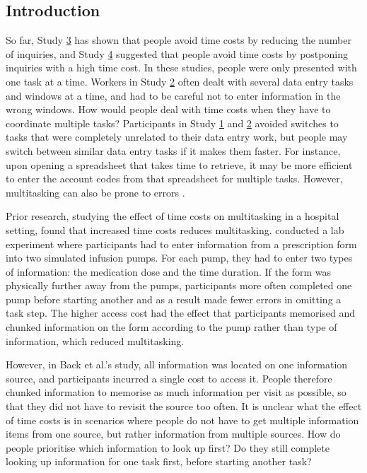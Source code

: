 \subsection{Introduction}
So far, Study \hyperref[st:Study3]{3} has shown that people avoid time costs by reducing the number of inquiries, and Study \hyperref[st:Study4]{4} suggested that people avoid time costs by postponing inquiries with a high time cost. In these studies, people were only presented with one task at a time. Workers in Study \hyperref[st:Study2]{2} often dealt with several data entry tasks and windows at a time, and had to be careful not to enter information in the wrong windows. How would people deal with time costs when they have to coordinate multiple tasks? Participants in Study \hyperref[st:Study1]{1} and \hyperref[st:Study2]{2} avoided switches to tasks that were completely unrelated to their data entry work, but people may switch between similar data entry tasks if it makes them faster. For instance, upon opening a spreadsheet that takes time to retrieve, it may be more efficient to enter the account codes from that spreadsheet for multiple tasks. However, multitasking can also be prone to errors \citep{Carrier2015}.

Prior research, studying the effect of time costs on multitasking in a hospital setting, found that increased time costs reduces multitasking. \citet{Back2012} conducted a lab experiment where participants had to enter information from a prescription form into two simulated infusion pumps. For each pump, they had to enter two types of information: the medication dose and the time duration. If the form was physically further away from the pumps, participants more often completed one pump before starting another and as a result made fewer errors in omitting a task step. The higher access cost had the effect that participants memorised and chunked information on the form according to the pump rather than type of information, which reduced multitasking.

However, in Back et al.'s study, all information was located on one information source, and participants incurred a single cost to access it. People therefore chunked information to memorise as much information per visit as possible, so that they did not have to revisit the source too often. It is unclear what the effect of time costs is in scenarios where people do not have to get multiple information items from one source, but rather information from multiple sources. How do people prioritise which information to look up first? Do they still complete looking up information for one task first, before starting another task?

